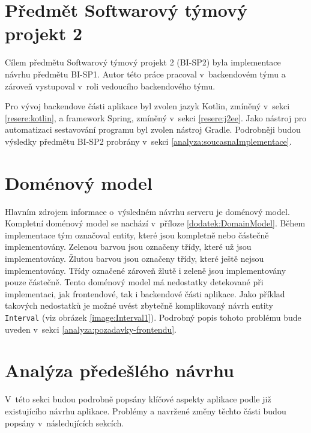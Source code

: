 \section{Předmět Softwarový týmový projekt 2}\label{analyza:navrh:sp2}
    Cílem předmětu Softwarový týmový projekt 2 (BI-SP2) byla implementace návrhu předmětu BI-SP1. Autor této práce pracoval v~backendovém týmu a zároveň vystupoval v~roli vedoucího backendového týmu.
    
    Pro vývoj backendove části aplikace byl zvolen jazyk Kotlin, zmíněný v~sekci \ref{resere:kotlin}, a framework Spring, zmíněný v~sekci \ref{resere:j2ee}. Jako nástroj pro automatizaci sestavování programu byl zvolen nástroj Gradle. Podrobněji  budou výsledky předmětu BI-SP2 probrány v~sekci \ref{analyza:soucasnaImplementace}.
        
    
\section{Doménový model}\label{analyza:navrh:DomainModel}
    Hlavním zdrojem informace o~výsledném návrhu serveru je doménový model. Kompletní doménový model se nachází v~příloze \ref{dodatek:DomainModel}. Během implementace tým označoval entity, které jsou kompletně nebo částečně implementovány. Zelenou barvou jsou označeny třídy, které už jsou implementovány. Žlutou barvou jsou označeny třídy, které ještě nejsou implementovány. Třídy označené zároveň žlutě i zeleně jsou implementovány pouze částečně. Tento doménový model má nedostatky detekované při implementaci, jak frontendové, tak i backendové části aplikace. Jako příklad takových nedostatků je možné uvést zbytečně komplikovaný návrh entity \texttt{Interval} (viz obrázek \ref{image:Interval1}). Podrobný popis tohoto problému bude uveden v~sekci \ref{analyza:pozadavky-frontendu}.

\section{Analýza předešlého návrhu} \label{analyza:analyza navrhu}
    V~této sekci budou podrobně popsány klíčové aspekty aplikace podle již existujícího návrhu aplikace. Problémy a navržené změny těchto části budou popsány v~následujících sekcích.


